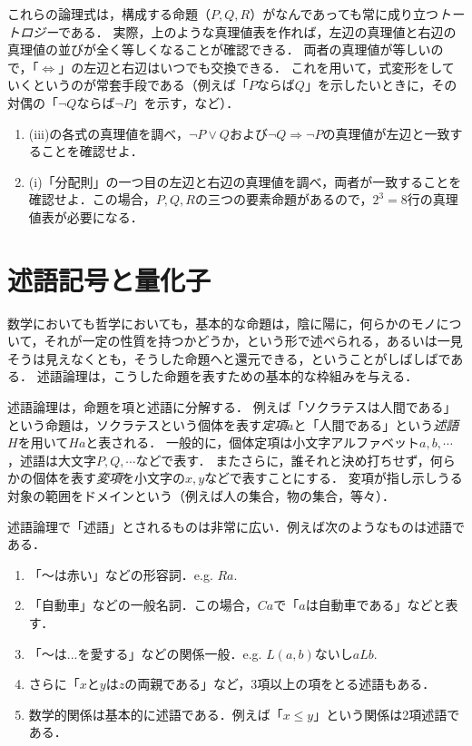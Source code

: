 \documentclass[11pt,a4paper]{jsarticle}
\begin{document}
これらの論理式は，構成する命題（$P, Q, R$）がなんであっても常に成り立つ\emph{トートロジー}である．
実際，上のような真理値表を作れば，左辺の真理値と右辺の真理値の並びが全く等しくなることが確認できる．
両者の真理値が等しいので，「$\iff$」の左辺と右辺はいつでも交換できる．
これを用いて，式変形をしていくというのが常套手段である（例えば「$P$ならば$Q$」を示したいときに，その対偶の「$\neg Q$ならば$\neg P$」を示す，など）．


\begin{exercise} 
 \begin{enumerate}
     \item (iii)の各式の真理値を調べ，$\neg P \vee Q$および$\neg Q \Rightarrow \neg P$の真理値が左辺と一致することを確認せよ．
     \item (i)「分配則」の一つ目の左辺と右辺の真理値を調べ，両者が一致することを確認せよ．この場合，$P, Q, R$の三つの要素命題があるので，$2^3=8$行の真理値表が必要になる．
 \end{enumerate}
\end{exercise}

\section{述語記号と量化子}
数学においても哲学においても，基本的な命題は，陰に陽に，何らかのモノについて，それが一定の性質を持つかどうか，という形で述べられる，あるいは一見そうは見えなくとも，そうした命題へと還元できる，ということがしばしばである．
述語論理は，こうした命題を表すための基本的な枠組みを与える．

述語論理は，命題を項と述語に分解する．
例えば「ソクラテスは人間である」という命題は，ソクラテスという個体を表す\emph{定項}$a$と「人間である」という\emph{述語}$H$を用いて$Ha$と表される．
一般的に，個体定項は小文字アルファベット$a, b, \cdots$，述語は大文字$P, Q, \cdots$などで表す．
またさらに，誰それと決め打ちせず，何らかの個体を表す\emph{変項}を小文字の$x, y$などで表すことにする． 
変項が指し示しうる対象の範囲をドメインという（例えば人の集合，物の集合，等々）．

述語論理で「述語」とされるものは非常に広い．例えば次のようなものは述語である．
\begin{enumerate}
    \item 「〜は赤い」などの形容詞．e.g. $Ra$.
    \item 「自動車」などの一般名詞．この場合，$Ca$で「$a$は自動車である」などと表す．
    \item 「〜は...を愛する」などの関係一般．e.g. $L(a,b)$ないし$aLb$. 
    \item さらに「$x$と$y$は$z$の両親である」など，3項以上の項をとる述語もある．
    \item 数学的関係は基本的に述語である．例えば「$x \leq y$」という関係は2項述語である．
\end{enumerate}
\end{document}
